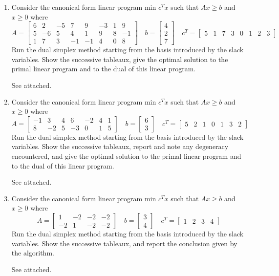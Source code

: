 \documentclass{article}
\begin{document}
\begin{enumerate}
	\item Consider the canonical form linear program min $c^T x$ such that $Ax\ge b$ and $x\ge 0$ where \[A=\begin{bmatrix}
				6 & 2 & -5 & 7 & 9 & -3 & 1 & 9 \\
				5 & -6 & 5 & 4 & 1 & 9 & 8 & -1 \\
				1 & 7 & 3 & -1 & -1 & 4 & 0 & 8
			\end{bmatrix} \quad b=\begin{bmatrix}
				4 \\ 2 \\ 7
			\end{bmatrix}\quad c^T = \begin{bmatrix}
				5 & 1 & 7 & 3 & 0 & 1 & 2 & 3
		\end{bmatrix}\] Run the dual simplex method starting from the basis introduced by the slack variables. Show the successive tableaux, give the optimal solution to the primal linear program and to the dual of this linear program. 
		\begin{answer*}
			See attached.
		\end{answer*}

	\item Consider the canonical form linear program min $c^T x$ such that $Ax\ge b$ and $x\ge 0$ where \[A=\begin{bmatrix}
				-1 & 3 & 4 & 6 & -2 & 4 & 1 \\
				8 & -2 & 5 & -3 & 0 & 1 & 5
			\end{bmatrix} \quad b=\begin{bmatrix}
				6 \\ 3
			\end{bmatrix} \quad c^T = \begin{bmatrix}
				5 & 2 & 1 & 0 & 1 & 3 & 2
		\end{bmatrix}\] Run the dual simplex method starting from the basis introduced by the slack variables. Show the successive tableaux, report and note any degeneracy encountered, and give the optimal solution to the primal linear program and to the dual of this linear program.
		\begin{answer*}
			See attached.
		\end{answer*}

	\item Consider the canonical form linear program min $c^T x$ such that $Ax\ge b$ and $x\ge 0$ where \[A=\begin{bmatrix}
				1 & -2 & -2 & -2 \\
				-2 & 1 & -2 & -2
			\end{bmatrix}\quad b=\begin{bmatrix}
				3 \\ 4
			\end{bmatrix}\quad c^T=\begin{bmatrix}
				1 & 2 & 3 & 4
		\end{bmatrix}\] Run the dual simplex method starting from the basis introduced by the slack variables. Show the successive tableaux, and report the conclusion given by the algorithm.
		\begin{answer*}
			See attached.
		\end{answer*}
		
\end{enumerate}
\end{document}
